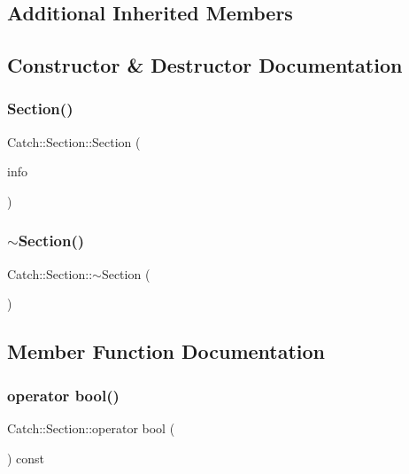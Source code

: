 \subsection*{Additional Inherited Members}


\subsection{Constructor \& Destructor Documentation}
\mbox{\label{class_catch_1_1_section_a68fd4e51e8981aaa7ddb00d8a6abd099}} 
\subsubsection{\texorpdfstring{Section()}{Section()}}
{\footnotesize\ttfamily Catch\+::\+Section\+::\+Section (\begin{DoxyParamCaption}\item[{\mbox{\hyperlink{struct_catch_1_1_section_info}{Section\+Info}} const \&}]{info }\end{DoxyParamCaption})}

\mbox{\label{class_catch_1_1_section_aa1422edd68a77aa578b5cc6b8b69f86f}} 
\subsubsection{\texorpdfstring{$\sim$Section()}{~Section()}}
{\footnotesize\ttfamily Catch\+::\+Section\+::$\sim$\+Section (\begin{DoxyParamCaption}{ }\end{DoxyParamCaption})}



\subsection{Member Function Documentation}
\mbox{\label{class_catch_1_1_section_a0632b804dcea1417a2970620a9742eb3}} 
\subsubsection{\texorpdfstring{operator bool()}{operator bool()}}
{\footnotesize\ttfamily Catch\+::\+Section\+::operator bool (\begin{DoxyParamCaption}{ }\end{DoxyParamCaption}) const\hspace{0.3cm}{\ttfamily [explicit]}}



